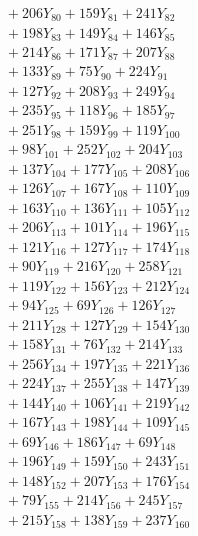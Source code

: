 \documentclass[a4paper,10pt]{article}
\begin{document}
{\begin{align}
&\;  + 206 Y_{80} + 159 Y_{81} + 241 Y_{82} \\[0.3ex]
&\;  + 198 Y_{83} + 149 Y_{84} + 146 Y_{85} \\[0.3ex]
&\;  + 214 Y_{86} + 171 Y_{87} + 207 Y_{88} \\[0.5ex]\allowbreak
&\;  + 133 Y_{89} + 75 Y_{90} + 224 Y_{91} \\[0.3ex]
&\;  + 127 Y_{92} + 208 Y_{93} + 249 Y_{94} \\[0.3ex]
&\;  + 235 Y_{95} + 118 Y_{96} + 185 Y_{97} \\[0.3ex]
&\;  + 251 Y_{98} + 159 Y_{99} + 119 Y_{100} \\[0.3ex]
&\;  + 98 Y_{101} + 252 Y_{102} + 204 Y_{103} \\[0.3ex]
&\;  + 137 Y_{104} + 177 Y_{105} + 208 Y_{106} \\[0.3ex]
&\;  + 126 Y_{107} + 167 Y_{108} + 110 Y_{109} \\[0.3ex]
&\;  + 163 Y_{110} + 136 Y_{111} + 105 Y_{112} \\[0.3ex]
&\;  + 206 Y_{113} + 101 Y_{114} + 196 Y_{115} \\[0.3ex]
&\;  + 121 Y_{116} + 127 Y_{117} + 174 Y_{118} \\[0.5ex]\allowbreak
&\;  + 90 Y_{119} + 216 Y_{120} + 258 Y_{121} \\[0.3ex]
&\;  + 119 Y_{122} + 156 Y_{123} + 212 Y_{124} \\[0.3ex]
&\;  + 94 Y_{125} + 69 Y_{126} + 126 Y_{127} \\[0.3ex]
&\;  + 211 Y_{128} + 127 Y_{129} + 154 Y_{130} \\[0.3ex]
&\;  + 158 Y_{131} + 76 Y_{132} + 214 Y_{133} \\[0.3ex]
&\;  + 256 Y_{134} + 197 Y_{135} + 221 Y_{136} \\[0.3ex]
&\;  + 224 Y_{137} + 255 Y_{138} + 147 Y_{139} \\[0.3ex]
&\;  + 144 Y_{140} + 106 Y_{141} + 219 Y_{142} \\[0.3ex]
&\;  + 167 Y_{143} + 198 Y_{144} + 109 Y_{145} \\[0.3ex]
&\;  + 69 Y_{146} + 186 Y_{147} + 69 Y_{148} \\[0.5ex]\allowbreak
&\;  + 196 Y_{149} + 159 Y_{150} + 243 Y_{151} \\[0.3ex]
&\;  + 148 Y_{152} + 207 Y_{153} + 176 Y_{154} \\[0.3ex]
&\;  + 79 Y_{155} + 214 Y_{156} + 245 Y_{157} \\[0.3ex]
&\;  + 215 Y_{158} + 138 Y_{159} + 237 Y_{160} \\[0.3ex]

\end{align}}
\end{document}
